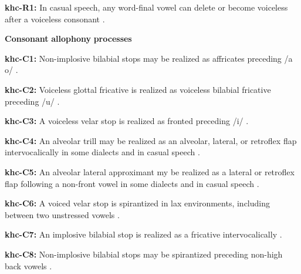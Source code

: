 \documentclass[output=paper]{langsci/langscibook}
\begin{document}
\begin{styleBody}
\textbf{khc-R1:} In casual speech, any word-final vowel can delete or become voiceless after a voiceless consonant \citep[23]{Donohue1999}.
\end{styleBody}

\begin{styleBody}
\textbf{Consonant} \textbf{allophony} \textbf{processes}
\end{styleBody}

\begin{styleBody}
\textbf{khc-C1:} Non-implosive bilabial stops may be realized as affricates preceding /a o/ \citep[16]{Donohue1999}.
\end{styleBody}

\begin{styleBody}
\textbf{khc-C2:} Voiceless glottal fricative is realized as voiceless bilabial fricative preceding /u/ \citep[19]{Donohue1999}.
\end{styleBody}

\begin{styleBody}
\textbf{khc-C3:} A voiceless velar stop is realized as fronted preceding /i/ \citep[19]{Donohue1999}.
\end{styleBody}

\begin{styleBody}
\textbf{khc-C4:} An alveolar trill may be realized as an alveolar, lateral, or retroflex flap intervocalically in some dialects and in casual speech \citep[18]{Donohue1999}.
\end{styleBody}

\begin{styleBody}
\textbf{khc-C5:} An alveolar lateral approximant my be realized as a lateral or retroflex flap following a non-front vowel in some dialects and in casual speech \citep[18]{Donohue1999}.
\end{styleBody}

\begin{styleBody}
\textbf{khc-C6:} A voiced velar stop is spirantized in lax environments, including between two unstressed vowels \citep[27]{Donohue1999}.
\end{styleBody}

\begin{styleBody}
\textbf{khc-C7:} An implosive bilabial stop is realized as a fricative intervocalically \citep[16]{Donohue1999}.
\end{styleBody}

\begin{styleBody}
\textbf{khc-C8:} Non-implosive bilabial stops may be spirantized preceding non-high back vowels \citep[16]{Donohue1999}.
\end{styleBody}
\end{document}
